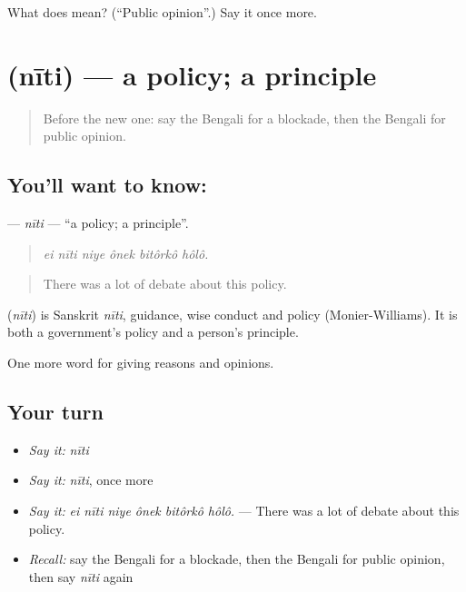 \begin{tcolorbox}[breakable,colback=teal!4,colframe=teal!35!black,title={Before you move on}]
What does  mean? (\textquotedblleft{}Public opinion\textquotedblright{}.) Say it once more.
\end{tcolorbox}
\section[\texorpdfstring{\bn{নীতি} (nīti)}{নীতি (nīti)}]{ (nīti) — a policy; a principle}

\label{lesson:BN-C349-niti}



\begin{quote}
Before the new one: say the Bengali for a blockade, then the Bengali for public opinion.
\end{quote}

\subsection*{You'll want to know: }
\textbf{} — \emph{nīti} — \textquotedblleft{}a policy; a principle\textquotedblright{}.

\begin{quote}
     
\end{quote}

\begin{quote}
\emph{ei nīti niye ônek bitôrkô hôlô.}
\end{quote}

\begin{quote}
There was a lot of debate about this policy.
\end{quote}

\begin{cousinweb}
\textbf{} (\emph{nīti}) is Sanskrit \emph{nīti}, guidance, wise conduct and policy (Monier-Williams). It is both a government's policy and a person's principle.
\end{cousinweb}

\begin{grammarlens}[title={What you've built}]
One more word for giving reasons and opinions.
\end{grammarlens}

\subsection*{Your turn}
\begin{itemize}
\raggedright
  \item \emph{Say it:} \emph{nīti}
  \item \emph{Say it:} \emph{nīti}, once more
  \item \emph{Say it:} \emph{ei nīti niye ônek bitôrkô hôlô.} — There was a lot of debate about this policy.
  \item \emph{Recall:} say the Bengali for a blockade, then the Bengali for public opinion, then say \emph{nīti} again
\end{itemize}

